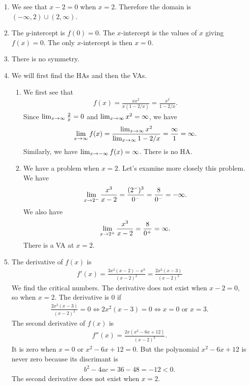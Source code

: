 	\begin{enumerate}[label=\textbf{\Alph*.}]
	\item We see that $x - 2 = 0$ when $x = 2$. Therefore the domain is $(-\infty , 2) \cup (2 , \infty )$.
	\item The $y$-intercept is $f(0) = 0$. The $x$-intercept is the values of $x$ giving $f(x) = 0$. The only $x$-intercept is then $x =0$.
	\item There is no symmetry.
	\item We will first find the HAs and then the VAs.
		\begin{enumerate}[label=\textbf{(\Roman*)}]
		\item We first see that
			\begin{align*}
			f(x) = \frac{x x^2}{x (1 - 2/x)} = \frac{x^2}{1 - 2/x} .
			\end{align*}
		Since $\lim_{x \rightarrow \infty} \frac{2}{x} = 0$ and $\lim_{x \rightarrow \infty} x^2 = \infty$, we have
			\begin{align*}
			\lim_{x \rightarrow \infty} f(x) = \frac{\lim_{x \rightarrow \infty} x^2}{\lim_{x \rightarrow \infty} 1 - 2/x} = \frac{\infty}{1} = \infty .
			\end{align*}
		Similarly, we have $\lim_{x \rightarrow -\infty} f(x) = \infty$. There is no HA.
		\item We have a problem when $x = 2$. Let's examine more closely this problem. We have
			\begin{align*}
			\lim_{x \rightarrow 2^-} \frac{x^3}{x - 2} = \frac{(2^-)^3}{0^-} = \frac{8}{0^-} = -\infty .
			\end{align*}
		We also have
			\begin{align*}
			\lim_{x \rightarrow 2^+} \frac{x^3}{x - 2} = \frac{8}{0^+} = \infty .
			\end{align*}
		There is a VA at $x = 2$.
		\end{enumerate}
	\item The derivative of $f(x)$ is
		\begin{align*}
		f'(x) = \frac{3x^2 (x - 2) - x^3}{(x - 2)^2} = \frac{2x^2(x - 3)}{(x - 2)^2}
		\end{align*}
	We find the critical numbers. The derivative does not exist when $x - 2 = 0$, so when $x = 2$. The derivative is $0$ if
		\begin{align*}
		\frac{2x^2(x - 3)}{(x - 2)^2} = 0 \iff 2x^2 (x - 3) = 0 \iff x = 0 \text{ or } x = 3 .
		\end{align*}
	The second derivative of $f(x)$ is
		\begin{align*}
		f''(x) = \frac{2x (x^2 - 6x + 12)}{(x -2)^3} .
		\end{align*}
	It is zero when $x = 0$ or $x^2 - 6x + 12 = 0$. But the polynomial $x^2 - 6x + 12$ is never zero because its discrimant is 
		\begin{align*}
		b^2 - 4ac = 36 - 48 = -12 < 0 .
		\end{align*}
	The second derivative does not exist when $x = 2$. 
		

\end{enumerate}
